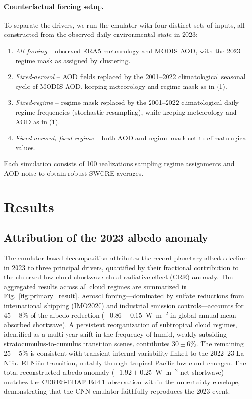 \documentclass{article}
\begin{document}
\paragraph{Counterfactual forcing setup.}
To separate the drivers, we run the emulator with four distinct sets of inputs, all constructed from the observed daily environmental state in 2023:
\begin{enumerate}
    \item \emph{All-forcing} -- observed ERA5 meteorology and MODIS AOD, with the 2023 regime mask as assigned by clustering.
    \item \emph{Fixed-aerosol} -- AOD fields replaced by the 2001--2022 climatological seasonal cycle of MODIS AOD, keeping meteorology and regime mask as in (1).
    \item \emph{Fixed-regime} -- regime mask replaced by the 2001--2022 climatological daily regime frequencies (stochastic resampling), while keeping meteorology and AOD as in (1).
    \item \emph{Fixed-aerosol, fixed-regime} -- both AOD and regime mask set to climatological values.
\end{enumerate}
Each simulation consists of 100 realizations sampling regime assignments and AOD noise to obtain robust SWCRE averages.

\section{Results}

\subsection*{Attribution of the 2023 albedo anomaly}

The emulator-based decomposition attributes the record planetary albedo decline in 2023 to three principal drivers, quantified by their fractional contribution to the observed low-cloud shortwave cloud radiative effect (CRE) anomaly. The aggregated results across all cloud regimes are summarized in Fig.~\ref{fig:primary_result}. Aerosol forcing—dominated by sulfate reductions from international shipping (IMO2020) and industrial emission controls—accounts for $45 \pm 8\%$ of the albedo reduction ($-0.86 \pm 0.15$~W~m$^{-2}$ in global annual‐mean absorbed shortwave). A persistent reorganization of subtropical cloud regimes, identified as a multi‐year shift in the frequency of humid, weakly subsiding stratocumulus‐to‐cumulus transition scenes, contributes $30 \pm 6\%$. The remaining $25 \pm 5\%$ is consistent with transient internal variability linked to the 2022–23 La Niña–El Niño transition, notably through tropical Pacific low‐cloud changes. The total reconstructed albedo anomaly ($-1.92 \pm 0.25$~W~m$^{-2}$ net shortwave) matches the CERES-EBAF Ed4.1 observation within the uncertainty envelope, demonstrating that the CNN emulator faithfully reproduces the 2023 event.
\end{document}
